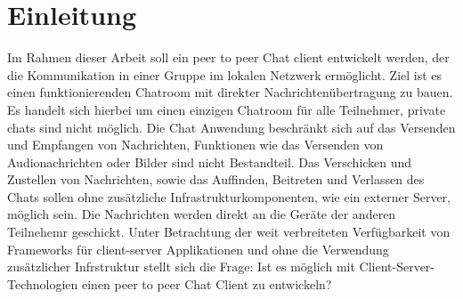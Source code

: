 \section{Einleitung}
Im Rahmen dieser Arbeit soll ein peer to peer Chat client entwickelt werden, der die Kommunikation in einer Gruppe im lokalen Netzwerk ermöglicht. 
Ziel ist es einen funktionierenden Chatroom mit direkter Nachrichtenübertragung zu bauen.
Es handelt sich hierbei um einen einzigen Chatroom für alle Teilnehmer, private chats sind nicht möglich. 
Die Chat Anwendung beschränkt sich auf das Versenden und Empfangen von Nachrichten, Funktionen wie das Versenden von Audionachrichten oder Bilder sind nicht Bestandteil. 
Das Verschicken und Zustellen von Nachrichten, sowie das Auffinden, Beitreten und Verlassen des Chats sollen ohne zusätzliche Infrastrukturkomponenten, wie ein externer Server, möglich sein.
Die Nachrichten werden direkt an die Geräte der anderen Teilnehemr geschickt. 
Unter Betrachtung der weit verbreiteten Verfügbarkeit von Frameworks für client-server Applikationen und ohne die Verwendung zusätzlicher Infrstruktur stellt sich die Frage: 
Ist es möglich mit Client-Server-Technologien einen peer to peer Chat Client zu entwickeln?